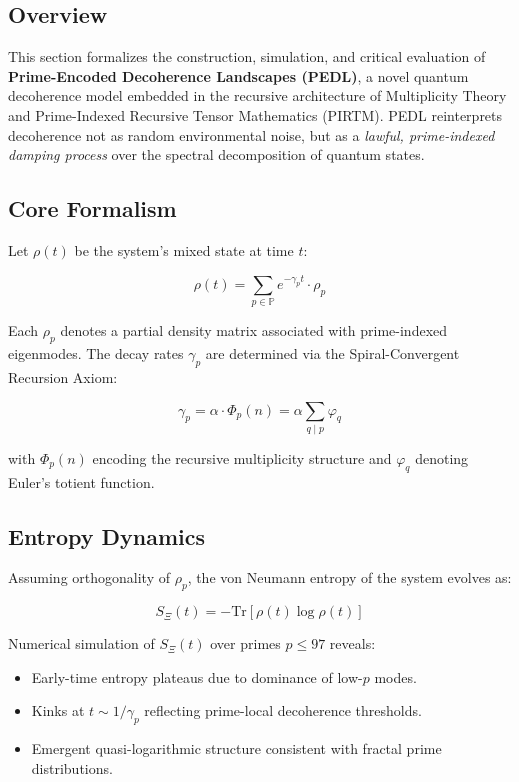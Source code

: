 \documentclass[12]{amsart}
\theoremstyle{plain}
\begin{document}
\subsection{Overview}

This section formalizes the construction, simulation, and critical evaluation of \textbf{Prime-Encoded Decoherence Landscapes (PEDL)}, a novel quantum decoherence model embedded in the recursive architecture of Multiplicity Theory and Prime-Indexed Recursive Tensor Mathematics (PIRTM). PEDL reinterprets decoherence not as random environmental noise, but as a \emph{lawful, prime-indexed damping process} over the spectral decomposition of quantum states.

\subsection{Core Formalism}

Let $\rho(t)$ be the system's mixed state at time $t$:

\begin{equation}
\rho(t) = \sum_{p \in \mathbb{P}} e^{-\gamma_p t} \cdot \rho_p
\end{equation}

Each $\rho_p$ denotes a partial density matrix associated with prime-indexed eigenmodes. The decay rates $\gamma_p$ are determined via the Spiral-Convergent Recursion Axiom:

\begin{equation}
\gamma_p = \alpha \cdot \Phi_p(n) = \alpha \sum_{q \mid p} \varphi_q
\end{equation}

with $\Phi_p(n)$ encoding the recursive multiplicity structure and $\varphi_q$ denoting Euler's totient function.

\subsection{Entropy Dynamics}

Assuming orthogonality of $\rho_p$, the von Neumann entropy of the system evolves as:

\begin{equation}
S_\Xi(t) = -\mathrm{Tr}[\rho(t) \log \rho(t)]
\end{equation}

Numerical simulation of $S_\Xi(t)$ over primes $p \leq 97$ reveals:

\begin{itemize}
    \item Early-time entropy plateaus due to dominance of low-$p$ modes.
    \item Kinks at $t \sim 1/\gamma_p$ reflecting prime-local decoherence thresholds.
    \item Emergent quasi-logarithmic structure consistent with fractal prime distributions.
\end{itemize}
\end{document}
